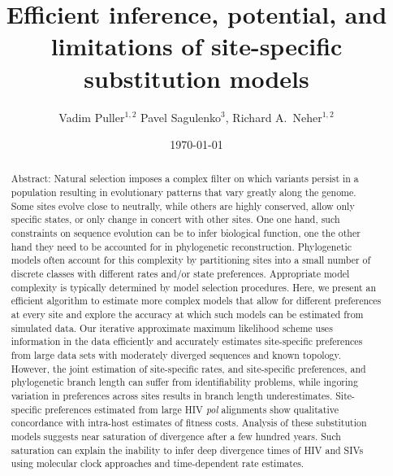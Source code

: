 \documentclass[aps,rmp,twocolumn,linenumbers]{revtex4-1}
\begin{document}
\title{Efficient inference, potential, and limitations of site-specific substitution models}
\author{Vadim Puller$^{1,2}$ Pavel Sagulenko$^{3}$, Richard A.~Neher$^{1,2}$}

\date{\today}

\begin{abstract}
Abstract: Natural selection imposes a complex filter on which variants persist in a population resulting in evolutionary patterns that vary greatly along the genome.
Some sites evolve close to neutrally, while others are highly conserved, allow only specific states, or only change in concert with other sites.
One one hand, such constraints on sequence evolution can be to infer biological function, one the other hand they need to be accounted for in phylogenetic reconstruction.
Phylogenetic models often account for this complexity by partitioning sites into a small number of discrete classes with different rates and/or state preferences.
Appropriate model complexity is typically determined by model selection procedures.
Here, we present an efficient algorithm to estimate more complex models that allow for different preferences at every site and explore the accuracy at which such models can be estimated from simulated data.
Our iterative approximate maximum likelihood scheme uses information in the data efficiently and accurately estimates site-specific preferences from large data sets with moderately diverged sequences and known topology.
However, the joint estimation of site-specific rates, and site-specific preferences, and phylogenetic branch length can suffer from identifiability problems, while ingoring variation in preferences across sites results in branch length underestimates.
Site-specific preferences estimated from large HIV \emph{pol} alignments show qualitative concordance with intra-host estimates of fitness costs.
Analysis of these substitution models suggests near saturation of divergence after a few hundred years.
Such saturation can explain the inability to infer deep divergence times of HIV and SIVs using molecular clock approaches and time-dependent rate estimates.
\end{abstract}

\maketitle
\end{document}
